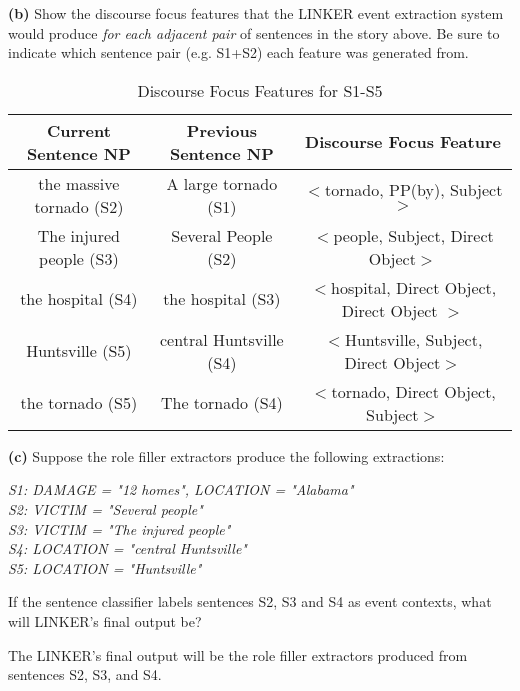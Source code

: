 \documentclass[11pt]{article}
\renewcommand\part[1]{\vspace{.10in}\textbf{(#1)}}
\begin{document}
\part{b} Show the discourse focus features that the LINKER event extraction system would produce \textit{for each adjacent pair} of sentences in the story above. Be sure to indicate which sentence pair (e.g. S1+S2) each feature was generated from.

 \begin{table}[H]
\centering
{\renewcommand{\arraystretch}{1.2}%
\begin{tabular}{| c | c | c |}
\hline
\textbf{Current Sentence NP} & \textbf{Previous Sentence NP} & \textbf{Discourse Focus Feature}\\
\hline
the massive tornado (S2)&  A large tornado (S1)& $<$tornado, PP(by), Subject$>$ \\ \hline
The injured people (S3)&  Several People (S2)& $<$people, Subject, Direct Object$>$ \\ \hline
the hospital (S4)&  the hospital (S3)& $<$hospital, Direct Object, Direct Object $>$ \\ \hline
Huntsville (S5)&  central Huntsville (S4)& $<$Huntsville, Subject, Direct Object$>$ \\ \hline
the tornado (S5)&  The tornado (S4)& $<$tornado, Direct Object, Subject$>$ \\ \hline
\end{tabular}}
\caption{Discourse Focus Features for S1-S5}
\end{table}

\part{c} Suppose the role filler extractors produce the following extractions:

\textit{S1: DAMAGE = "12 homes", LOCATION = "Alabama" \\
S2: VICTIM = "Several people" \\
S3: VICTIM = "The injured people" \\
S4: LOCATION = "central Huntsville" \\
S5: LOCATION = "Huntsville"} \newline

If the sentence classifier labels sentences S2, S3 and S4 as event contexts, what will LINKER's final output be?

The LINKER's final output will be the role filler extractors produced from sentences S2, S3, and S4.
\end{document}
